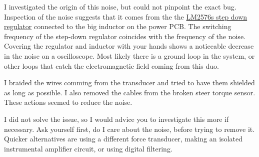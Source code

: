 I investigated the origin of this noise, but could not pinpoint the exact bug.
Inspection of the noise suggests that it comes from the the \href{https://www.ti.com/product/LM2576}{LM2576s step down regulator} connected to the big inductor on the power PCB. 
The switching frequency of the step-down regulator coincides with the frequency of the noise.
Covering the regulator and inductor with your hands shows a noticeable decrease in the noise on a oscilloscope.
Most likely there is a ground loop in the system, or other loops that catch the electromagnetic field coming from this duo.

I braided the wires comming from the transducer and tried to have them shielded as long as possible. 
I also removed the cables from the broken steer torque sensor. 
These actions seemed to reduce the noise.

I did not solve the issue, so I would advice you to investigate this more if necessary.
Ask yourself first, do I care about the noise, before trying to remove it.
Quicker alternatives are using a different force transducer, making an isolated instrumental amplifier circuit, or using digital filtering.